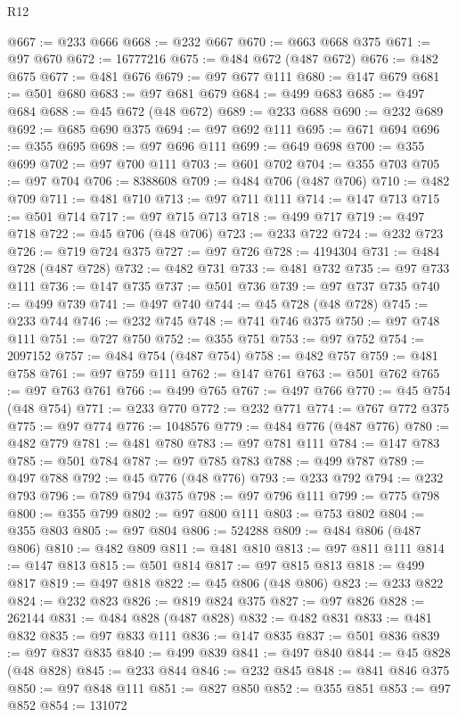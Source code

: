 \begin{lexlean}{R12}
\begin{coremodule}
@667 := @233 @666
@668 := @232 @667
@670 := @663 @668 @375
@671 := @97 @670
@672 := 16777216
@675 := @484 @672 (@487 @672)
@676 := @482 @675
@677 := @481 @676
@679 := @97 @677 @111
@680 := @147 @679
@681 := @501 @680
@683 := @97 @681 @679
@684 := @499 @683
@685 := @497 @684
@688 := @45 @672 (@48 @672)
@689 := @233 @688
@690 := @232 @689
@692 := @685 @690 @375
@694 := @97 @692 @111
@695 := @671 @694
@696 := @355 @695
@698 := @97 @696 @111
@699 := @649 @698
@700 := @355 @699
@702 := @97 @700 @111
@703 := @601 @702
@704 := @355 @703
@705 := @97 @704
@706 := 8388608
@709 := @484 @706 (@487 @706)
@710 := @482 @709
@711 := @481 @710
@713 := @97 @711 @111
@714 := @147 @713
@715 := @501 @714
@717 := @97 @715 @713
@718 := @499 @717
@719 := @497 @718
@722 := @45 @706 (@48 @706)
@723 := @233 @722
@724 := @232 @723
@726 := @719 @724 @375
@727 := @97 @726
@728 := 4194304
@731 := @484 @728 (@487 @728)
@732 := @482 @731
@733 := @481 @732
@735 := @97 @733 @111
@736 := @147 @735
@737 := @501 @736
@739 := @97 @737 @735
@740 := @499 @739
@741 := @497 @740
@744 := @45 @728 (@48 @728)
@745 := @233 @744
@746 := @232 @745
@748 := @741 @746 @375
@750 := @97 @748 @111
@751 := @727 @750
@752 := @355 @751
@753 := @97 @752
@754 := 2097152
@757 := @484 @754 (@487 @754)
@758 := @482 @757
@759 := @481 @758
@761 := @97 @759 @111
@762 := @147 @761
@763 := @501 @762
@765 := @97 @763 @761
@766 := @499 @765
@767 := @497 @766
@770 := @45 @754 (@48 @754)
@771 := @233 @770
@772 := @232 @771
@774 := @767 @772 @375
@775 := @97 @774
@776 := 1048576
@779 := @484 @776 (@487 @776)
@780 := @482 @779
@781 := @481 @780
@783 := @97 @781 @111
@784 := @147 @783
@785 := @501 @784
@787 := @97 @785 @783
@788 := @499 @787
@789 := @497 @788
@792 := @45 @776 (@48 @776)
@793 := @233 @792
@794 := @232 @793
@796 := @789 @794 @375
@798 := @97 @796 @111
@799 := @775 @798
@800 := @355 @799
@802 := @97 @800 @111
@803 := @753 @802
@804 := @355 @803
@805 := @97 @804
@806 := 524288
@809 := @484 @806 (@487 @806)
@810 := @482 @809
@811 := @481 @810
@813 := @97 @811 @111
@814 := @147 @813
@815 := @501 @814
@817 := @97 @815 @813
@818 := @499 @817
@819 := @497 @818
@822 := @45 @806 (@48 @806)
@823 := @233 @822
@824 := @232 @823
@826 := @819 @824 @375
@827 := @97 @826
@828 := 262144
@831 := @484 @828 (@487 @828)
@832 := @482 @831
@833 := @481 @832
@835 := @97 @833 @111
@836 := @147 @835
@837 := @501 @836
@839 := @97 @837 @835
@840 := @499 @839
@841 := @497 @840
@844 := @45 @828 (@48 @828)
@845 := @233 @844
@846 := @232 @845
@848 := @841 @846 @375
@850 := @97 @848 @111
@851 := @827 @850
@852 := @355 @851
@853 := @97 @852
@854 := 131072

\end{coremodule}
\end{lexlean}

